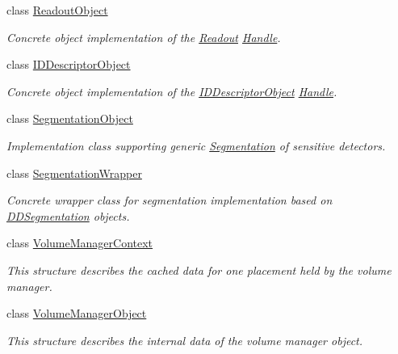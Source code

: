 \begin{DoxyCompactItemize}
class \hyperlink{class_d_d4hep_1_1_geometry_1_1_readout_object}{ReadoutObject}
\begin{DoxyCompactList}\small\item\em Concrete object implementation of the \hyperlink{class_d_d4hep_1_1_geometry_1_1_readout}{Readout} \hyperlink{class_d_d4hep_1_1_handle}{Handle}. \item\end{DoxyCompactList}\item 
class \hyperlink{class_d_d4hep_1_1_geometry_1_1_i_d_descriptor_object}{IDDescriptorObject}
\begin{DoxyCompactList}\small\item\em Concrete object implementation of the \hyperlink{class_d_d4hep_1_1_geometry_1_1_i_d_descriptor_object}{IDDescriptorObject} \hyperlink{class_d_d4hep_1_1_handle}{Handle}. \item\end{DoxyCompactList}\item 
class \hyperlink{class_d_d4hep_1_1_geometry_1_1_segmentation_object}{SegmentationObject}
\begin{DoxyCompactList}\small\item\em Implementation class supporting generic \hyperlink{class_d_d4hep_1_1_geometry_1_1_segmentation}{Segmentation} of sensitive detectors. \item\end{DoxyCompactList}\item 
class \hyperlink{class_d_d4hep_1_1_geometry_1_1_segmentation_wrapper}{SegmentationWrapper}
\begin{DoxyCompactList}\small\item\em Concrete wrapper class for segmentation implementation based on \hyperlink{namespace_d_d4hep_1_1_d_d_segmentation}{DDSegmentation} objects. \item\end{DoxyCompactList}\item 
class \hyperlink{class_d_d4hep_1_1_geometry_1_1_volume_manager_context}{VolumeManagerContext}
\begin{DoxyCompactList}\small\item\em This structure describes the cached data for one placement held by the volume manager. \item\end{DoxyCompactList}\item 
class \hyperlink{class_d_d4hep_1_1_geometry_1_1_volume_manager_object}{VolumeManagerObject}
\begin{DoxyCompactList}\small\item\em This structure describes the internal data of the volume manager object. \item\end{DoxyCompactList}\end{DoxyCompactItemize}
